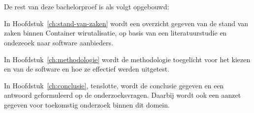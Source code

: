 \section{}
\label{sec:opzet-bachelorproef}


De rest van deze bachelorproef is als volgt opgebouwd:

In Hoofdstuk~\ref{ch:stand-van-zaken} wordt een overzicht gegeven van de stand van zaken binnen Container wirutalisatie, op basis van een literatuurstudie en ondezeoek naar software aanbieders.

In Hoofdstuk~\ref{ch:methodologie} wordt de methodologie toegelicht voor het kiezen en van de software en hoe ze effectief werden uitgetest.


In Hoofdstuk~\ref{ch:conclusie}, tenslotte, wordt de conclusie gegeven en een antwoord geformuleerd op de onderzoeksvragen. Daarbij wordt ook een aanzet gegeven voor toekomstig onderzoek binnen dit domein.